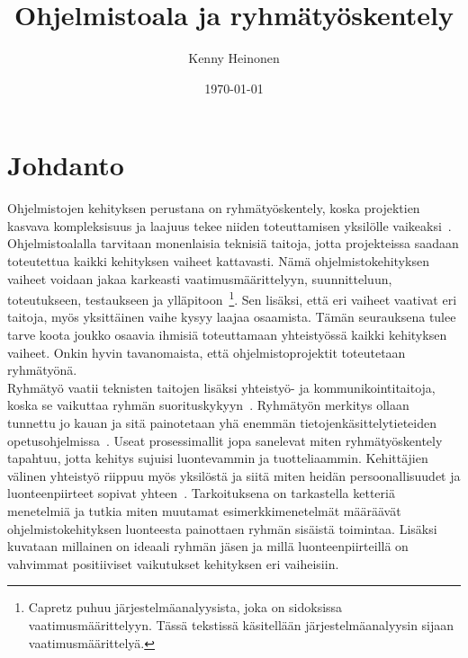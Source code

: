 \documentclass[finnish]{../tktltiki2}
\title{Ohjelmistoala ja ryhmätyöskentely}
\author{Kenny Heinonen}
\date{\today}
\theoremstyle{definition}
\theoremstyle{remark}
\begin{document}

\maketitle        %

\tableofcontents  %
\newpage          %



\section{Johdanto}

Ohjelmistojen kehityksen perustana on ryhmätyöskentely, koska projektien
kasvava kompleksisuus ja laajuus tekee niiden toteuttamisen yksilölle
vaikeaksi~\cite{5593527}.
Ohjelmistoalalla tarvitaan monenlaisia teknisiä taitoja, jotta projekteissa saadaan toteutettua kaikki kehityksen vaiheet 
kattavasti. Nämä ohjelmistokehityksen vaiheet voidaan jakaa karkeasti 
vaatimusmäärittelyyn, suunnitteluun, toteutukseen, testaukseen ja 
ylläpitoon~\cite{Capretz:2010:MSS:1726559.1726574}\footnote{Capretz puhuu järjestelmäanalyysista, joka on sidoksissa vaatimusmäärittelyyn. Tässä tekstissä käsitellään järjestelmäanalyysin sijaan vaatimusmäärittelyä.}. Sen lisäksi, että 
eri vaiheet vaativat eri taitoja, myös yksittäinen vaihe kysyy laajaa 
osaamista. Tämän seurauksena tulee tarve koota joukko osaavia ihmisiä 
toteuttamaan yhteistyössä kaikki kehityksen vaiheet. Onkin hyvin 
tavanomaista, että ohjelmistoprojektit toteutetaan ryhmätyönä.\\

Ryhmätyö vaatii teknisten taitojen lisäksi yhteistyö- ja kommunikointitaitoja, koska
se vaikuttaa ryhmän suorituskykyyn~\cite{Hall:2007:CNT:1235000.1235043}. Ryhmätyön merkitys ollaan
tunnettu jo kauan ja sitä painotetaan yhä enemmän tietojenkäsittelytieteiden opetusohjelmissa~\cite{Cushing:2003:TBP:948785.948797,5593527,1158709,Pieterse:2012:PPS:2157136.2157218}.
Useat prosessimallit jopa sanelevat miten ryhmätyöskentely tapahtuu, jotta kehitys sujuisi luontevammin ja tuotteliaammin.
Kehittäjien välinen yhteistyö riippuu myös yksilöstä ja siitä miten heidän persoonallisuudet ja
luonteenpiirteet sopivat yhteen~\cite{Acuna:2008:ESP:1414004.1414056,Hall:2007:CNT:1235000.1235043}. Tarkoituksena on tarkastella ketteriä menetelmiä ja tutkia miten muutamat esimerkkimenetelmät
määräävät ohjelmistokehityksen luonteesta painottaen ryhmän sisäistä toimintaa. Lisäksi kuvataan
millainen on ideaali ryhmän jäsen ja
millä luonteenpiirteillä on vahvimmat positiiviset vaikutukset kehityksen eri vaiheisiin. \\
\end{document}
